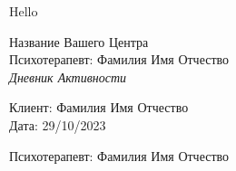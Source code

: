 \documentclass[a4paper,12pt,oneside,headsepline]{scrartcl}
\begin{document}
Hello


\begin{tcbraster}[raster columns=2, raster equal height=rows, 
size=small,boxrule=0pt,frame hidden, bicolor, colbacklower=white]
\begin{tcolorbox}
  {\sffamily\Large Название Вашего Центра \\ }
  {Психотерапевт: Фамилия Имя Отчество \\}
  {\emph{\Large Дневник Активности}} \\
\end{tcolorbox}
\begin{tcolorbox}
  {\small Клиент: Фамилия Имя Отчество \\}
  {\small Дата: 29/10/2023 \\} 
\end{tcolorbox}
\end{tcbraster}


  {Психотерапевт: Фамилия Имя Отчество \\}
\end{document}
